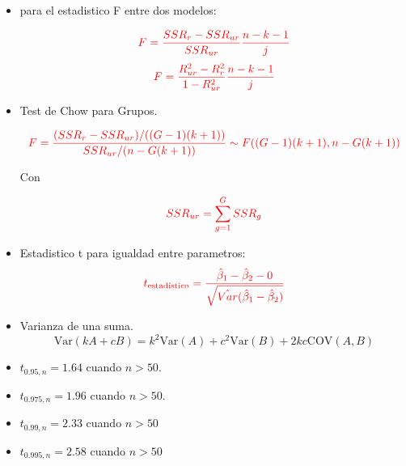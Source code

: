 \documentclass[10pt,a4paper]{article}
\begin{document}
\begin{enumerate}
\begin{itemize}
$${\color{red}\hat{\beta_j} \pm t_{\frac{\alpha}{2},n-k-1}s.e.(\hat{\beta_j})}$$


\item para el estadistico F entre dos modelos:

$$\color{red}{F=\frac{SSR_r-SSR_{ur}}{SSR_{ur}}\frac{n-k-1}{j}}$$
$$\color{red}{F=\frac{R^2_{ur}-R^2_{r}}{1-R^2_{ur}}\frac{n-k-1}{j}}$$

\item Test de Chow para Grupos.

    \[\color{red}
    F = \frac{(SSR_r - SSR_{ur}) / ((G - 1)(k + 1))}{SSR_{ur} / (n - G(k + 1))} \sim F((G - 1)(k + 1), n - G(k + 1))
    \]

Con

$$\color{red}SSR_{ur} = \sum_{g=1}^G SSR_g$$

\item Estadistico t para igualdad entre parametros:
 \[\color{red}t_{\text{estadístico}} = \frac{\hat{\beta}_1 - \hat{\beta}_2 - 0}{\sqrt{\hat{Var}(\hat{\beta}_1 - \hat{\beta}_2)}}\]


\item  Varianza de una suma.
{\color{red}
$$\text{Var}(kA + cB) = k^2\text{Var}(A) + c^2\text{Var}(B) + 2kc\text{COV}(A, B)$$}

\item $t_{0.95,n} = 1.64$ cuando $n >50$.
\item $t_{0.975,n} = 1.96$ cuando $n >50$.
\item $t_{0.99,n}=2.33$ cuando $n>50$
\item $t_{0.995,n}=2.58$ cuando $n>50$



\end{itemize}
\end{enumerate}
\end{document}
